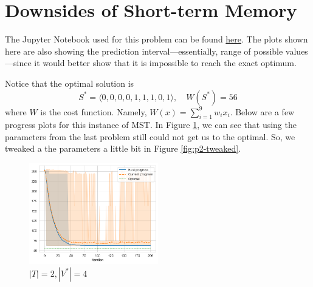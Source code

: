 \section{Downsides of Short-term Memory}

The Jupyter Notebook used for this problem can be found \href{https://github.com/nngerncham/ma395_heuristic/blob/main/homework/hw3/codebase/Notebooks/Problem\%202.ipynb}{here}. The plots shown here are also showing the prediction interval---essentially, range of possible values---since it would better show that it is impossible to reach the exact optimum.

Notice that the optimal solution is
\[
    S^* = \langle 0, 0, 0, 0, 1, 1, 1, 0, 1 \rangle,\quad W(S^*) = 56
\]
where \(W\) is the cost function. Namely, \(W(x) = \sum_{i=1}^9 w_i x_i\). Below are a few progress plots for this instance of MST. In Figure \ref{fig:p2-default}, we can see that using the parameters from the last problem still could not get us to the optimal. So, we tweaked a the parameters a little bit in Figure \ref{fig:p2-tweaked}.

\begin{figure}[ht]
    \centering
    \includegraphics[width=0.5\textwidth]{../images/p2/default.png}
    \caption{\(|T| = 2, |V^*| = 4\)}
    \label{fig:p2-default}
\end{figure}

